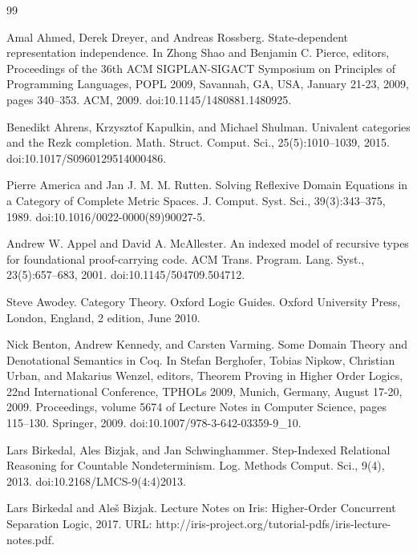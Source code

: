\documentclass[10pt,a4paper]{article}
\begin{document}
\begin{thebibliography}{99}
\par\noindent    Amal Ahmed, Derek Dreyer, and Andreas Rossberg.  State-dependent representation independence.  In Zhong Shao and Benjamin C. Pierce, editors, Proceedings of the 36th ACM SIGPLAN-SIGACT Symposium on Principles of Programming Languages, POPL 2009, Savannah, GA, USA, January 21-23, 2009, pages 340–353. ACM, 2009.  doi:10.1145/1480881.1480925.  

\par\noindent    Benedikt Ahrens, Krzysztof Kapulkin, and Michael Shulman.  Univalent categories and the Rezk completion.  Math. Struct. Comput. Sci., 25(5):1010–1039, 2015.  doi:10.1017/S0960129514000486.  

\par\noindent    Pierre America and Jan J. M. M. Rutten.  Solving Reflexive Domain Equations in a Category of Complete Metric Spaces.  J. Comput. Syst. Sci., 39(3):343–375, 1989.  doi:10.1016/0022-0000(89)90027-5.  

\par\noindent    Andrew W. Appel and David A. McAllester.  An indexed model of recursive types for foundational proof-carrying code.  ACM Trans. Program. Lang. Syst., 23(5):657–683, 2001.  doi:10.1145/504709.504712.  

\par\noindent    Steve Awodey.  Category Theory.  Oxford Logic Guides. Oxford University Press, London, England, 2 edition, June 2010.  

\par\noindent    Nick Benton, Andrew Kennedy, and Carsten Varming.  Some Domain Theory and Denotational Semantics in Coq.  In Stefan Berghofer, Tobias Nipkow, Christian Urban, and Makarius Wenzel, editors, Theorem Proving in Higher Order Logics, 22nd International Conference, TPHOLs 2009, Munich, Germany, August 17-20, 2009. Proceedings, volume 5674 of Lecture Notes in Computer Science, pages 115–130. Springer, 2009.  doi:10.1007/978-3-642-03359-9\_10.  

\par\noindent    Lars Birkedal, Ales Bizjak, and Jan Schwinghammer.  Step-Indexed Relational Reasoning for Countable Nondeterminism.  Log. Methods Comput. Sci., 9(4), 2013.  doi:10.2168/LMCS-9(4:4)2013.  

\par\noindent    Lars Birkedal and Aleš Bizjak.  Lecture Notes on Iris: Higher-Order Concurrent Separation Logic, 2017.  URL: http://iris-project.org/tutorial-pdfs/iris-lecture-notes.pdf.  


\end{thebibliography}
\end{document}
